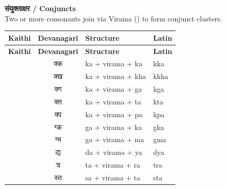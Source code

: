 {\bfseries\small संयुक्ताक्षर / Conjuncts} \\
{\small Two or more consonants join via Virama () to form conjunct clusters.}
\begin{longtable}{@{} c c l l @{}}
\toprule
\textbf{Kaithi} & \textbf{Devanagari} & \textbf{Structure} & \textbf{Latin} \\
\midrule
\endfirsthead
\toprule
\textbf{Kaithi} & \textbf{Devanagari} & \textbf{Structure} & \textbf{Latin} \\
\midrule
\endhead
\bottomrule
\endfoot

\K{\bka\bvir\bka} & क्क & ka + virama + ka & kka \\
\K{\bka\bvir\bkha} & क्ख & ka + virama + kha & kkha \\
\K{\bka\bvir\bga} & क्ग & ka + virama + ga & kga \\
\K{\bka\bvir\bta} & क्त & ka + virama + ta & kta \\
\K{\bka\bvir\bpa} & क्प & ka + virama + pa & kpa \\
\K{\bga\bvir\bka} & ग्क & ga + virama + ka & gka \\
\K{\bga\bvir\bma} & ग्म & ga + virama + ma & gma \\
\K{\bda\bvir\bka} & द्य & da + virama + ya & dya \\
\K{\bta\bvir\bra} & त्र & ta + virama + ra & tra \\
\K{\bsa\bvir\bta} & स्त & sa + virama + ta & sta \\
\bottomrule
\end{longtable}
